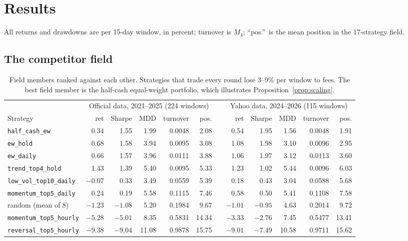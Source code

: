 \documentclass[11pt,a4paper]{article}
\begin{document}
\section{Results}\label{sec:results}

All returns and drawdowns are per 15-day window, in percent; turnover is $M_4$; ``pos.''\ is the mean position in the
17-strategy field.

\subsection{The competitor field}
\begin{table}[h]
\centering\scriptsize
\setlength{\tabcolsep}{3pt}
\begin{tabular}{lrrrrrcrrrrr}
\toprule
 & \multicolumn{5}{c}{Official data, 2021--2025 (224 windows)} & & \multicolumn{5}{c}{Yahoo data, 2024--2026 (115 windows)} \\
\cmidrule{2-6}\cmidrule{8-12}
Strategy & ret & Sharpe & MDD & turnover & pos. & & ret & Sharpe & MDD & turnover & pos. \\
\midrule
\texttt{half\_cash\_ew} & 0.34 & 1.55 & 1.99 & 0.0048 & 2.08 & & 0.54 & 1.95 & 1.56 & 0.0048 & 1.91 \\
\texttt{ew\_hold} & 0.68 & 1.58 & 3.94 & 0.0095 & 3.08 & & 1.08 & 1.98 & 3.10 & 0.0096 & 2.95 \\
\texttt{ew\_daily} & 0.66 & 1.57 & 3.96 & 0.0111 & 3.88 & & 1.06 & 1.97 & 3.12 & 0.0113 & 3.60 \\
\texttt{trend\_top4\_hold} & 1.43 & 1.39 & 5.40 & 0.0095 & 5.33 & & 1.23 & 1.02 & 5.44 & 0.0096 & 6.03 \\
\texttt{low\_vol\_top10\_daily} & $-0.07$ & 0.33 & 3.49 & 0.0559 & 5.39 & & 0.18 & 0.43 & 3.04 & 0.0588 & 5.68 \\
\texttt{momentum\_top5\_daily} & 0.24 & 0.19 & 5.58 & 0.1115 & 7.46 & & 0.58 & 0.50 & 5.41 & 0.1108 & 7.58 \\
random (mean of 8) & $-1.23$ & $-1.08$ & 5.20 & 0.1984 & 9.67 & & $-1.01$ & $-0.95$ & 4.63 & 0.2014 & 9.72 \\
\texttt{momentum\_top5\_hourly} & $-5.28$ & $-5.01$ & 8.35 & 0.5831 & 14.34 & & $-3.33$ & $-2.76$ & 7.45 & 0.5477 & 13.41 \\
\texttt{reversal\_top5\_hourly} & $-9.38$ & $-9.04$ & 11.08 & 0.9878 & 15.75 & & $-9.01$ & $-7.49$ & 10.58 & 0.9711 & 15.62 \\
\bottomrule
\end{tabular}
\caption{Field members ranked against each other. Strategies that trade every round lose 3--9\% per window to fees.
The best field member is the half-cash equal-weight portfolio, which illustrates Proposition~\ref{prop:scaling}.}
\label{tab:field}
\end{table}
\end{document}
